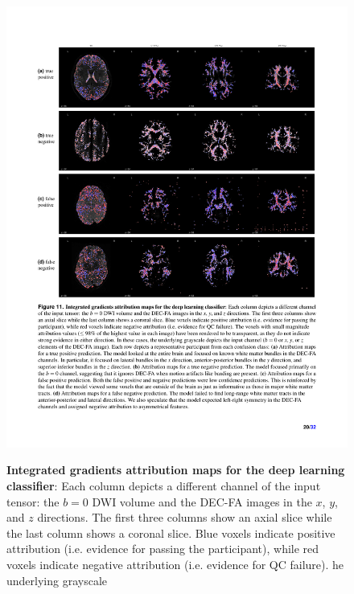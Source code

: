 \documentclass[fleqn,10pt,inline]{wlscirep}
\begin{document}
\begin{figure}[tbp]
    {\label{fig:ig:true-pos}}
    {\label{fig:ig:true-neg}}
    {\label{fig:ig:false-pos}}
    {\label{fig:ig:false-neg}}
    \centering
    \includegraphics[width=\linewidth]{deep-learning-qc/attribution_maps.pdf}
    \caption{%
        {\bf Integrated gradients attribution maps for the deep learning classifier}:
        Each column depicts a different channel of the input tensor: the $b=0$
        DWI volume and the DEC-FA images in the $x$, $y$, and $z$ directions.
        The first three columns show an axial slice while the last column
        shows a coronal slice. Blue voxels indicate positive attribution (i.e.
        evidence for passing the participant), while red voxels indicate negative
        attribution (i.e. evidence for QC failure). he underlying grayscale
}
\end{figure}
\end{document}
